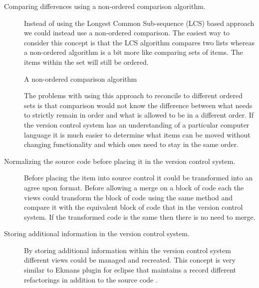 \begin{description}
  \item [Comparing differences using a non-ordered comparison algorithm.]   
    Instead of using the Longest Common Sub-sequence (LCS) based approach we could instead use a non-ordered comparison.  The easiest way to consider this concept is that the LCS algorithm compares two lists whereas a non-ordered algorithm is a bit more like comparing sets of items. The items within the set will still be ordered.

    \begin{algorithm}[H]
    \SetAlgoLined
    \caption{A non-ordered comparison algorithm}
    \end{algorithm}


    The problems with using this approach to reconcile to different ordered sets is that comparison would not know the difference between what needs to strictly remain in order and what is allowed to be in a different order. If the version control system has an understanding of a particular computer language it is much easier to determine what items can be moved without changing functionality and which ones need to stay in the same order. 
  \item [Normalizing the source code before placing it in the version control system.]
    Before placing the item into source control it could be transformed into an agree upon format. Before allowing a merge on a block of code each the views could transform the block of code using the same method and compare it with the equivalent block of code that in the version control system. If the transformed code is the same then there is no need to merge.
  \item [Storing additional information in the version control system.]
    By storing additional information within the version control system different views could be managed and recreated.
    This concept is very similar to Ekmans plugin for eclipse that maintains a record different refactorings in addition to the source code \cite{Ekman2004}.


\end{description}
